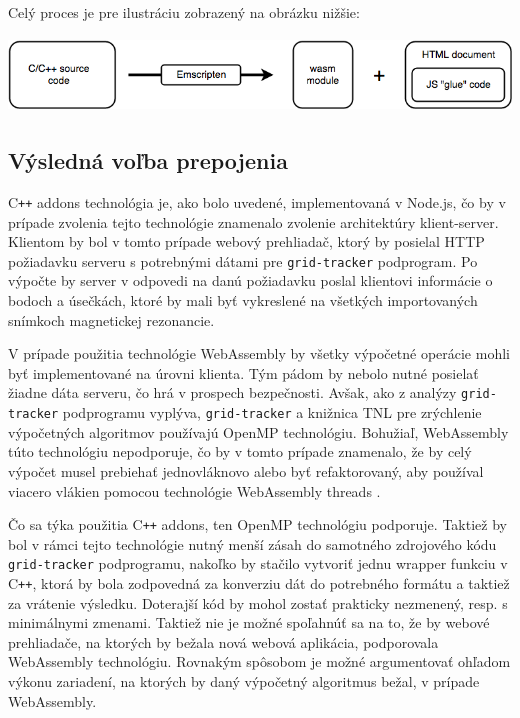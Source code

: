 Celý proces je pre ilustráciu zobrazený na obrázku nižšie:
\begin {center}
        \centering
        \includegraphics[height=2cm]{media/graphs/cpp_to_wasm.png}
        \captionsetup{justification=centering}
\end {center}

\subsection {Výsledná voľba prepojenia}
C\texttt{++} addons technológia je, ako bolo uvedené, implementovaná v Node.js, čo by v prípade zvolenia tejto technológie znamenalo zvolenie architektúry klient-server. Klientom by bol v tomto prípade webový prehliadač, ktorý by posielal HTTP požiadavku serveru s potrebnými dátami pre \texttt{grid-tracker} podprogram. Po výpočte by server v odpovedi na danú požiadavku poslal klientovi informácie o bodoch a úsečkách, ktoré by mali byť vykreslené na všetkých importovaných snímkoch magnetickej rezonancie.

V prípade použitia technológie WebAssembly by všetky výpočetné operácie mohli byť implementované na úrovni klienta. Tým pádom by nebolo nutné posielať žiadne dáta serveru, čo hrá v prospech bezpečnosti. Avšak, ako z analýzy \texttt{grid-tracker} podprogramu vyplýva, \texttt{grid-tracker} a knižnica TNL pre zrýchlenie výpočetných algoritmov používajú OpenMP technológiu.
Bohužiaľ, WebAssembly túto technológiu nepodporuje, čo by v tomto prípade znamenalo, že by celý výpočet musel prebiehať jednovláknovo alebo byť refaktorovaný, aby používal viacero vlákien pomocou technológie WebAssembly threads \cite{webassembly_threads}.

Čo sa týka použitia C\texttt{++} addons, ten OpenMP technológiu podporuje. Taktiež by bol v rámci tejto technológie nutný menší zásah do samotného zdrojového kódu \texttt{grid-tracker} podprogramu, nakoľko by stačilo vytvoriť jednu wrapper funkciu v C\texttt{++}, ktorá by bola zodpovedná za konverziu dát do potrebného formátu a taktiež za vrátenie výsledku. Doterajší kód by mohol zostať prakticky nezmenený, resp. s minimálnymi zmenami.
Taktiež nie je možné spoľahnúť sa na to, že by webové prehliadače, na ktorých by bežala nová webová aplikácia, podporovala WebAssembly technológiu. Rovnakým spôsobom je možné argumentovať ohľadom výkonu zariadení, na ktorých by daný výpočetný algoritmus bežal, v prípade WebAssembly.

